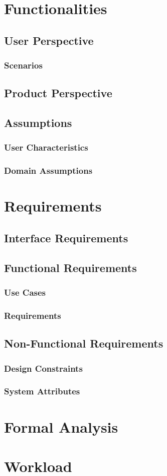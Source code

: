 \documentclass[a4paper, oneside]{book}
\begin{document}
\chapter{Functionalities}
\section{User Perspective}
\subsection{Scenarios}
\section{Product Perspective}
\section{Assumptions}
\subsection{User Characteristics}
\subsection{Domain Assumptions}

\chapter{Requirements}
\section{Interface Requirements}
\section{Functional Requirements}
\subsection{Use Cases}
\subsection{Requirements}
\section{Non-Functional Requirements}
\subsection{Design Constraints}
\subsection{System Attributes}

\chapter{Formal Analysis}

\chapter{Workload}


\end{document}
